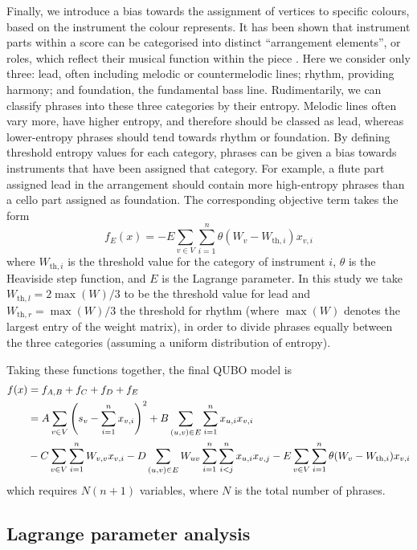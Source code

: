 \documentclass[12pt]{article}
\theoremstyle{definition}
\begin{document}
Finally, we introduce a bias towards the assignment of vertices to specific colours, based on the instrument the colour represents. It has been shown that instrument parts within a score can be categorised into distinct ``arrangement elements'', or roles, which reflect their musical function within the piece \cite{owsinski_mixing_2017}. Here we consider only three: lead, often including melodic or countermelodic lines; rhythm, providing harmony; and foundation, the fundamental bass line. Rudimentarily, we can classify phrases into these three categories by their entropy. Melodic lines often vary more, have higher entropy, and therefore should be classed as lead, whereas lower-entropy phrases should tend towards rhythm or foundation. By defining threshold entropy values for each category, phrases can be given a bias towards instruments that have been assigned that category. For example, a flute part assigned lead in the arrangement should contain more high-entropy phrases than a cello part assigned as foundation. The corresponding objective term takes the form
\begin{equation}
    f_E(x) = -E\sum_{v\in V}\sum_{i=1}^n \theta(W_v - W_{\text{th},i})x_{v,i}
\end{equation}
where $W_{\text{th},i}$ is the threshold value for the category of instrument $i$, $\theta$ is the Heaviside step function, and $E$ is the Lagrange parameter. In this study we take ${W_{\text{th},l}=2\max(W)/3}$ to be the threshold value for lead and ${W_{\text{th},r}=\max(W)/3}$ the threshold for rhythm (where $\max(W)$ denotes the largest entry of the weight matrix), in order to divide phrases equally between the three categories (assuming a uniform distribution of entropy).

Taking these functions together, the final QUBO model is
\begin{align}
    f(x)&=f_{A,B}+f_C+f_D+f_E \notag\\
    &=A\sum_{v \in V}\left(s_v-\sum_{i=1}^{n} x_{v,i}\right)^2+B\sum_{(u,v) \in E}\sum_{i=1}^n x_{u,i}x_{v,i} \notag\\
    &-C\sum_{v \in V}\sum_{i=1}^n W_{v,v}x_{v,i}-D\sum_{(u,v)\in E}W_{uv}\sum_{i=1}^n\sum_{i<j}^n x_{u,i}x_{v,j}-E\sum_{v \in V}\sum_{i=1}^n\theta(W_v-W_{\text{th},i})x_{v,i}
    \label{eq:problem-qubo}
\end{align}
which requires $N(n+1)$ variables, where $N$ is the total number of phrases.

\subsection{Lagrange parameter analysis}
\end{document}
